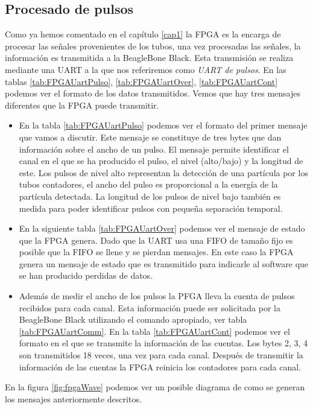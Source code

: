 	\subsection{Procesado de pulsos}
		Como ya hemos comentado en el capítulo \ref{cap1} la FPGA es la encarga de procesar las señales provenientes de los tubos, una vez
		procesadas las señales, la información es transmitida a la BeagleBone Black. Esta transmisión se realiza mediante una UART a la que
		nos referiremos como \emph{UART de pulsos}. En las tablas \ref{tab:FPGAUartPulso}, \ref{tab:FPGAUartOver}, \ref{tab:FPGAUartCont}
		podemos ver el formato de los datos transmitidos. Vemos que hay tres mensajes diferentes que la FPGA puede transmitir.
		\begin{itemize}
			\item	En la tabla \ref{tab:FPGAUartPulso} podemos ver el formato del primer mensaje que vamos a discutir. Este mensaje se
				constituye de tres bytes que dan información sobre el ancho de un pulso. El mensaje permite identificar el canal en el
				que se ha producido el pulso, el nivel (alto/bajo) y la longitud de este. Los pulsos de nivel alto representan la
				detección de una partícula por los tubos contadores, el ancho del pulso es proporcional a la energía de la partícula
				detectada. La longitud de los pulsos de nivel bajo también es medida para poder identificar pulsos con pequeña
				separación temporal.
			\item 	En la siguiente tabla \ref{tab:FPGAUartOver} podemos ver el mensaje de estado que la FPGA genera. Dado que la UART usa
				una FIFO de tamaño fijo es posible que la FIFO se llene y se pierdan mensajes. En este caso la FPGA genera un mensaje
				de estado que es transmitido para indicarle al software que se han producido perdidas de datos.
			\item	Además de medir el ancho de los pulsos la PFGA lleva la cuenta de pulsos recibidos para cada canal. Esta información
				puede ser solicitada por la BeagleBone Black utilizando el comando apropiado, ver tabla \ref{tab:FPGAUartComm}. En la
				tabla \ref{tab:FPGAUartCont} podemos ver el formato en el que se transmite la información de las cuentas. Los bytes 2,
				3, 4 son transmitidos 18 veces, una vez para cada canal. Después de transmitir la información de las cuentas la FPGA
				reinicia los contadores para cada canal.
		\end{itemize}
		En la figura \ref{fig:fpgaWave} podemos ver un posible diagrama de como se generan los mensajes anteriormente descritos.

